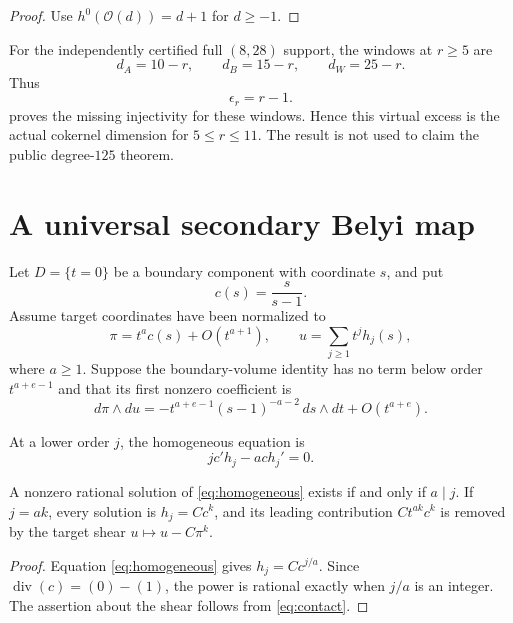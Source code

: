 \documentclass[11pt,reqno]{amsart}
\begin{document}
\begin{proof}
Use \(h^0(\mathcal O(d))=d+1\) for \(d\ge-1\).
\end{proof}

For the independently certified full \((8,28)\) support, the windows at
\(r\ge5\) are
\[
d_A=10-r,\qquad d_B=15-r,\qquad d_W=25-r.
\]
Thus
\[
\epsilon_r=r-1.
\]
 proves the missing injectivity for these
windows.  Hence this virtual excess is the actual cokernel dimension for
\(5\le r\le11\).  The result is not used to claim the public
degree-\(125\) theorem.

\section{A universal secondary Belyi map}
\label{sec:secondary}

Let \(D=\{t=0\}\) be a boundary component with coordinate \(s\), and put
\[
c(s)=\frac{s}{s-1}.
\]
Assume target coordinates have been normalized to
\begin{equation}
\label{eq:contact}
\pi=t^ac(s)+O(t^{a+1}),\qquad
u=\sum_{j\ge1}t^jh_j(s),
\end{equation}
where \(a\ge1\).  Suppose the boundary-volume identity has no term below
order \(t^{a+e-1}\) and that its first nonzero coefficient is
\begin{equation}
\label{eq:volume}
d\pi\wedge du
=-t^{a+e-1}(s-1)^{-a-2}\,ds\wedge dt
+O(t^{a+e}).
\end{equation}

At a lower order \(j\), the homogeneous equation is
\begin{equation}
\label{eq:homogeneous}
jc'h_j-ach_j'=0.
\end{equation}

\begin{lemma}
\label{lem:resonance}
A nonzero rational solution of \eqref{eq:homogeneous} exists if and only if
\(a\mid j\).  If \(j=ak\), every solution is \(h_j=Cc^k\), and its
leading contribution \(Ct^{ak}c^k\) is removed by the target shear
\(u\mapsto u-C\pi^k\).
\end{lemma}

\begin{proof}
Equation \eqref{eq:homogeneous} gives \(h_j=Cc^{j/a}\).  Since
\(\operatorname{div}(c)=(0)-(1)\), the power is rational exactly when
\(j/a\) is an integer.  The assertion about the shear follows from
\eqref{eq:contact}.
\end{proof}
\end{document}
